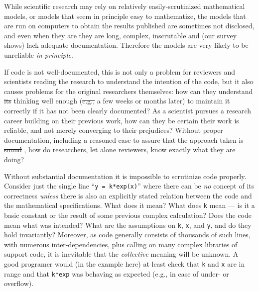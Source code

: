 \documentclass{comjnl}
\providecommand{\DIFadd}[1]{{\protect\color{blue}\uwave{#1}}} %
\providecommand{\DIFdel}[1]{{\protect\color{red}\sout{#1}}}                      %
\providecommand{\DIFaddbegin}{} %
\providecommand{\DIFaddend}{} %
\providecommand{\DIFdelbegin}{} %
\providecommand{\DIFdelend}{} %
\begin{document}
{While scientific research may rely on relatively easily-scrutinized mathematical models, or models that seem in principle easy to mathematize, the models that are run on computers to obtain the results published are sometimes not disclosed, and even when they are they are long, complex, inscrutable and (\DIFaddbegin \DIFadd{as }\DIFaddend our survey shows) lack adequate documentation. Therefore the models are very likely to be unreliable \emph{in principle}. 

If code is not well-documented, this is not only a problem for reviewers and scientists reading the research to understand the intention of the code, but it also causes problems for the original researchers themselves: how can they understand \DIFdelbegin \DIFdel{its }\DIFdelend \DIFaddbegin \DIFadd{their historical }\DIFaddend thinking well enough (\DIFdelbegin \DIFdel{e.g., }\DIFdelend \DIFaddbegin \DIFadd{say, just }\DIFaddend a few weeks or months later) to maintain it correctly if it has not been clearly documented? As a scientist pursues a research career building on their previous work, how can they be certain their work is reliable, and not merely converging to their  prejudices? Without proper documentation, including a reasoned case to assure that the approach taken is \DIFdelbegin \DIFdel{sound }\DIFdelend \DIFaddbegin \DIFadd{appropriate }\DIFaddend \cite{assurance-case}, how do researchers, let alone reviewers, know exactly what they are doing?

Without substantial documentation it is impossible to scrutinize code properly. Consider just the single line ``\texttt{y = k*exp(x)}'' where there can be \emph{no\/} concept of its correctness \emph{unless\/} there is also an explicitly stated relation between the code and the mathematical specifications. What does it mean? What does \texttt{k} mean --- is it a basic constant or the result of some previous complex calculation? Does the code mean what was intended? What are the assumptions on \texttt{k}, \texttt{x}, and \texttt{y}, and do they hold invariantly? Moreover, as code generally consists of thousands of such lines, with numerous inter-dependencies, plus calling on many complex libraries of support code, it is inevitable that the \emph{collective\/} meaning will be unknown. A good programer would (in the example here) at least check that \texttt{k} and \texttt{x} are in range and that \texttt{k*exp} was behaving as expected (e.g., in case of under- or overflow).

}
\end{document}
